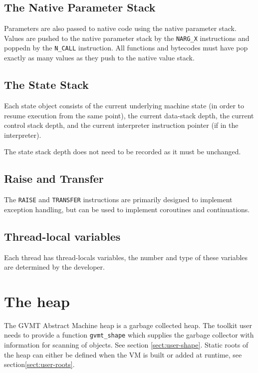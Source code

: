 
\subsection{The Native Parameter Stack}
Parameters are also passed to native code using the native parameter stack. Values are pushed to the native parameter stack by the \verb|NARG_X| instructions and poppedn by the \verb|N_CALL| instruction. All functions and bytecodes must have pop exactly as many values as they push to the native value stack.

\subsection{The State Stack}
Each state object consists of the current underlying machine state (in order to resume execution from the same point), the current data-stack depth, the current control stack depth, and the current interpreter instruction pointer (if in the interpreter).

The state stack depth does not need to be recorded as it must be unchanged.

\subsection{Raise and Transfer}
The  \verb|RAISE| and \verb|TRANSFER| instructions are primarily designed to implement exception handling, but can be used to implement coroutines and continuations.

\subsection{Thread-local variables}
Each thread has thread-locals variables, the number and type of these variables are determined by the developer.

\section{The heap}
The GVMT Abstract Machine heap is a garbage collected heap. The toolkit user needs to provide a function \verb|gvmt_shape| which supplies the garbage collector with information for scanning of objects. See section \ref{sect:user-shape}.
Static roots of the heap can either be defined when the VM is built or added at runtime, see section\ref{sect:user-roots}.

